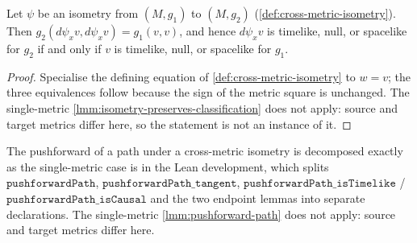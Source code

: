 \begin{lemma}
    \label{lmm:cross-metric-isometry-preserves-classification}
    Let $\psi$ be an isometry from $(M,g_1)$ to $(M,g_2)$ (\ref{def:cross-metric-isometry}). Then $g_2(d\psi_x v, d\psi_x v) = g_1(v,v)$, and hence $d\psi_x v$ is timelike, null, or spacelike for $g_2$ if and only if $v$ is timelike, null, or spacelike for $g_1$.
\end{lemma}
\begin{proof}
    Specialise the defining equation of \ref{def:cross-metric-isometry} to $w = v$; the three equivalences follow because the sign of the metric square is unchanged. The single-metric \ref{lmm:isometry-preserves-classification} does not apply: source and target metrics differ here, so the statement is not an instance of it.
\end{proof}

The pushforward of a path under a cross-metric isometry is decomposed exactly as the single-metric case is in the Lean development, which splits $\mathtt{pushforwardPath}$, $\mathtt{pushforwardPath\_tangent}$, $\mathtt{pushforwardPath\_isTimelike}$ / $\mathtt{pushforwardPath\_isCausal}$ and the two endpoint lemmas into separate declarations. The single-metric \ref{lmm:pushforward-path} does not apply: source and target metrics differ here.

